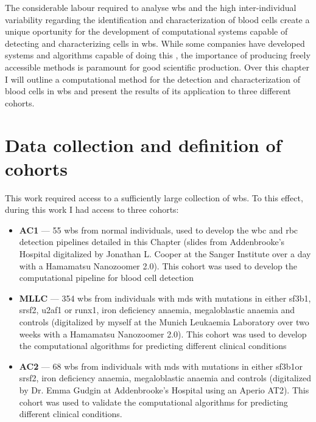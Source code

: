 The considerable labour required to analyse \ac{wbs} and the high inter-individual variability regarding the identification and characterization of blood cells create a unique oportunity for the development of computational systems capable of detecting and characterizing cells in \ac{wbs}. While some companies have developed systems and algorithms capable of doing this \cite{cellavision,advia-120}, the importance of producing freely accessible methods is paramount for good scientific production. Over this chapter I will outline a computational method for the detection and characterization of blood cells in \ac{wbs} and present the results of its application to three different cohorts.

\section{Data collection and definition of cohorts}

This work required access to a sufficiently large collection of \ac{wbs}. To this effect, during this work I had access to three cohorts:

\begin{itemize}
    \item \textbf{AC1} --- 55 \ac{wbs} from normal individuals, used to develop the \ac{wbc} and \ac{rbc} detection pipelines detailed in this Chapter (slides from Addenbrooke's Hospital digitalized by Jonathan L. Cooper at the Sanger Institute over a day with a Hamamatsu Nanozoomer 2.0). This cohort was used to develop the computational pipeline for blood cell detection
    \item \textbf{MLLC} --- 354 \ac{wbs} from individuals with \ac{mds} with mutations in either \ac{sf3b1}, \ac{srsf2}, \ac{u2af1} or \ac{runx1}, iron deficiency anaemia, megaloblastic anaemia and controls (digitalized by myself at the Munich Leukaemia Laboratory over two weeks with a Hamamatsu Nanozoomer 2.0). This cohort was used to develop the computational algorithms for predicting different clinical conditions
    \item \textbf{AC2} --- 68 \ac{wbs} from individuals with \ac{mds} with mutations in either \ac{sf3b1}or \ac{srsf2}, iron deficiency anaemia, megaloblastic anaemia and controls (digitalized by Dr. Emma Gudgin at Addenbrooke's Hospital using an Aperio AT2). This cohort was used to validate the computational algorithms for predicting different clinical conditions.
\end{itemize}

